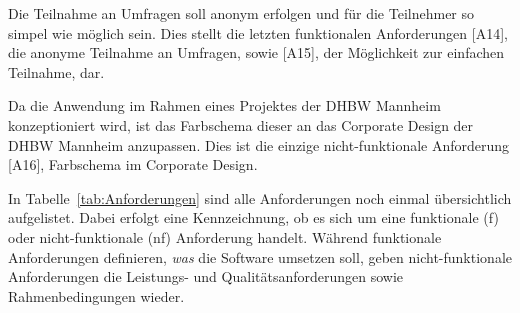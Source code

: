 Die Teilnahme an Umfragen soll anonym erfolgen und für die Teilnehmer so simpel wie möglich sein.
Dies stellt die letzten funktionalen Anforderungen [A14], die anonyme Teilnahme an Umfragen, sowie [A15], der Möglichkeit zur einfachen Teilnahme, dar.

Da die Anwendung im Rahmen eines Projektes der \acs{DHBW} Mannheim konzeptioniert wird, ist das Farbschema dieser an das Corporate Design der \acs{DHBW} Mannheim anzupassen.
Dies ist die einzige nicht-funktionale Anforderung [A16], Farbschema im Corporate Design.

In Tabelle~\vref{tab:Anforderungen} sind alle Anforderungen noch einmal übersichtlich aufgelistet.
Dabei erfolgt eine Kennzeichnung, ob es sich um eine funktionale (f) oder nicht-funktionale (nf) Anforderung handelt.
Während funktionale Anforderungen definieren, \emph{was} die Software umsetzen soll, geben nicht-funktionale Anforderungen die Leistungs- und Qualitätsanforderungen sowie Rahmenbedingungen wieder.\autocite[Vgl.][S. 10]{nl-robertson2012mastering}\autocite[Vgl.][S. 3 ff]{nl-braun2016nicht}


